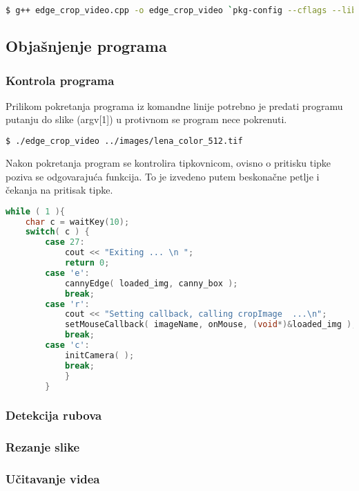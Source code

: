 \begin{lstlisting}[language=bash,caption={Pokretanje prevodioca iz
    komandne linije}]
$ g++ edge_crop_video.cpp -o edge_crop_video `pkg-config --cflags --libs opencv`
\end{lstlisting}

\newpage
\subsection{Objašnjenje programa}

\subsubsection{Kontrola programa}

Prilikom pokretanja programa iz komandne linije potrebno je 
predati programu putanju do slike (argv[1]) u protivnom se program 
nece pokrenuti. \\

\begin{lstlisting}[language=bash,caption={Pokretanje programa iz
    komandne linije}]
$ ./edge_crop_video ../images/lena_color_512.tif
\end{lstlisting}

Nakon pokretanja program se kontrolira tipkovnicom, ovisno o
pritisku tipke poziva se odgovarajuća funkcija. To je izvedeno 
putem beskonačne petlje i čekanja na pritisak tipke. 
\\

\begin{lstlisting}[language=C,caption={Kontrola programa tipkovnicom}]
while ( 1 ){
    char c = waitKey(10);
    switch( c ) {
        case 27:
            cout << "Exiting ... \n ";
            return 0;
        case 'e':
            cannyEdge( loaded_img, canny_box );
            break;
        case 'r':
            cout << "Setting callback, calling cropImage  ...\n";
            setMouseCallback( imageName, onMouse, (void*)&loaded_img );
            break;
        case 'c':
            initCamera( );
            break; 
            }
        }
\end{lstlisting}

\subsubsection{Detekcija rubova}
\subsubsection{Rezanje slike}
\subsubsection{Učitavanje videa}
% 

